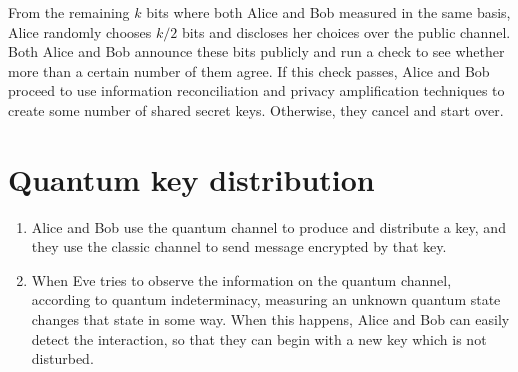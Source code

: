 \documentclass{article}
\begin{document}
From the remaining $k$ bits where both Alice and Bob measured in the same basis, Alice randomly chooses $k/2$ bits and discloses her choices over the public channel. Both Alice and Bob announce these bits publicly and run a check to see whether more than a certain number of them agree. If this check passes, Alice and Bob proceed to use information reconciliation and privacy amplification techniques to create some number of shared secret keys. Otherwise, they cancel and start over.

\section{Quantum key distribution}
\begin{enumerate}
\item
Alice and Bob use the quantum channel to produce and distribute a key, and they use the classic channel to send message encrypted by that key.
\item
When Eve tries to observe the information on the quantum channel, according to quantum indeterminacy, measuring an unknown quantum state changes that state in some way. When this happens, Alice and Bob can easily detect the interaction, so that they can begin with a new key which is not disturbed.
\end{enumerate}
\end{document}
